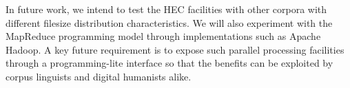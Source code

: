 In future work, we intend to test the HEC facilities with other corpora with different filesize distribution characteristics. We will also experiment with the MapReduce programming model through implementations such as Apache Hadoop. A key future requirement is to expose such parallel processing facilities through a programming-lite interface so that the benefits can be exploited by corpus linguists and digital humanists alike.










% 
% 
% 
% 
% 
% 
% 
% 
